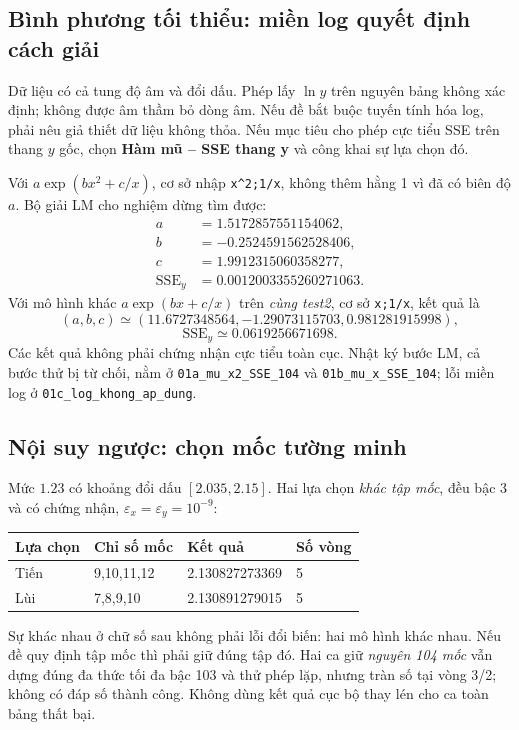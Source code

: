 \subsection{Bình phương tối thiểu: miền log quyết định cách giải}
Dữ liệu có cả tung độ âm và đổi dấu. Phép lấy $\ln y$ trên nguyên bảng không xác định; không được âm thầm bỏ dòng âm. Nếu đề bắt buộc tuyến tính hóa log, phải nêu giả thiết dữ liệu không thỏa. Nếu mục tiêu cho phép cực tiểu SSE trên thang $y$ gốc, chọn \textbf{Hàm mũ -- SSE thang y} và công khai sự lựa chọn đó.

Với $a\exp(bx^2+c/x)$, cơ sở nhập \texttt{x\^{}2;1/x}, không thêm hằng 1 vì đã có biên độ $a$. Bộ giải LM cho nghiệm dừng tìm được:
\begin{align*}
 a&=1.5172857551154062,\\
 b&=-0.2524591562528406,\\
 c&=1.9912315060358277,\\
 \mathrm{SSE}_y&=0.0012003355260271063.
\end{align*}
Với mô hình khác $a\exp(bx+c/x)$ trên \emph{cùng test2}, cơ sở \texttt{x;1/x}, kết quả là
\[
 (a,b,c)\simeq(11.6727348564,-1.29073115703,0.981281915998),
\]
\[
 \mathrm{SSE}_y\simeq0.0619256671698.
\]
Các kết quả không phải chứng nhận cực tiểu toàn cục. Nhật ký bước LM, cả bước thử bị từ chối, nằm ở \texttt{01a\_mu\_x2\_SSE\_104} và \texttt{01b\_mu\_x\_SSE\_104}; lỗi miền log ở \texttt{01c\_log\_khong\_ap\_dung}.

\subsection{Nội suy ngược: chọn mốc tường minh}
Mức $1.23$ có khoảng đổi dấu $[2.035,2.15]$. Hai lựa chọn \emph{khác tập mốc}, đều bậc 3 và có chứng nhận, $\varepsilon_x=\varepsilon_y=10^{-9}$:
\begin{center}\small\begin{tabular}{llll}\toprule
Lựa chọn&Chỉ số mốc&Kết quả&Số vòng\\\midrule
Tiến&9,10,11,12&2.130827273369&5\\
Lùi&7,8,9,10&2.130891279015&5\\\bottomrule
\end{tabular}\end{center}
Sự khác nhau ở chữ số sau không phải lỗi đổi biến: hai mô hình khác nhau. Nếu đề quy định tập mốc thì phải giữ đúng tập đó. Hai ca giữ \emph{nguyên 104 mốc} vẫn dựng đúng đa thức tối đa bậc 103 và thử phép lặp, nhưng tràn số tại vòng 3/2; không có đáp số thành công. Không dùng kết quả cục bộ thay lén cho ca toàn bảng thất bại.

